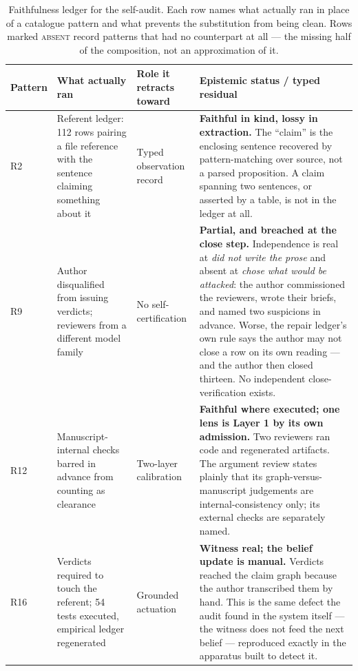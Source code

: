 \begin{table}[t]
\caption{Faithfulness ledger for the self-audit.  Each row names what actually
ran in place of a catalogue pattern and what prevents the substitution from
being clean.  Rows marked \textsc{absent} record patterns that had no
counterpart at all --- the missing half of the composition, not an
approximation of it.}
\label{tab:audit-retract}
\scriptsize
\setlength{\tabcolsep}{3pt}
\begin{tabular}{p{}p{}p{}p{}}
\toprule
\textbf{Pattern} & \textbf{What actually ran} & \textbf{Role it retracts toward} & \textbf{Epistemic status / typed residual} \\
\midrule
R2 & Referent ledger: 112 rows pairing a file reference with the sentence claiming something about it & Typed observation record & \textbf{Faithful in kind, lossy in extraction.}  The ``claim'' is the enclosing sentence recovered by pattern-matching over source, not a parsed proposition.  A claim spanning two sentences, or asserted by a table, is not in the ledger at all. \\
R9 & Author disqualified from issuing verdicts; reviewers from a different model family & No self-certification & \textbf{Partial, and breached at the close step.}  Independence is real at \emph{did not write the prose} and absent at \emph{chose what would be attacked}: the author commissioned the reviewers, wrote their briefs, and named two suspicions in advance.  Worse, the repair ledger's own rule says the author may not close a row on its own reading --- and the author then closed thirteen.  No independent close-verification exists. \\
R12 & Manuscript-internal checks barred in advance from counting as clearance & Two-layer calibration & \textbf{Faithful where executed; one lens is Layer 1 by its own admission.}  Two reviewers ran code and regenerated artifacts.  The argument review states plainly that its graph-versus-manuscript judgements are internal-consistency only; its external checks are separately named. \\
R16 & Verdicts required to touch the referent; 54 tests executed, empirical ledger regenerated & Grounded actuation & \textbf{Witness real; the belief update is manual.}  Verdicts reached the claim graph because the author transcribed them by hand.  This is the same defect the audit found in the system itself --- the witness does not feed the next belief --- reproduced exactly in the apparatus built to detect it. \\

\end{tabular}
\end{table}
